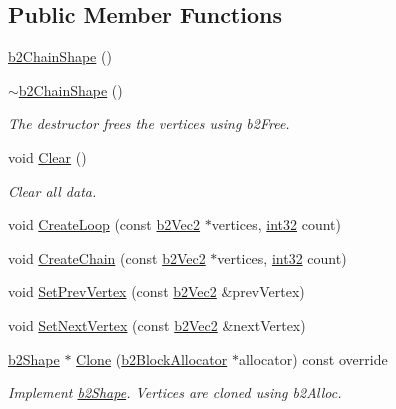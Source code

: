 \subsection*{Public Member Functions}
\begin{DoxyCompactItemize}
\item 
\mbox{\hyperlink{classb2_chain_shape_ac4fafbfed6f5894c9f8173d2a09a1fe7}{b2\+Chain\+Shape}} ()
\item 
\mbox{\hyperlink{classb2_chain_shape_a8c032394f5a85e7fc425a437e7689a18}{$\sim$b2\+Chain\+Shape}} ()
\begin{DoxyCompactList}\small\item\em The destructor frees the vertices using b2\+Free. \end{DoxyCompactList}\item 
void \mbox{\hyperlink{classb2_chain_shape_a434d4b61ab15726302ec5ad484011c33}{Clear}} ()
\begin{DoxyCompactList}\small\item\em Clear all data. \end{DoxyCompactList}\item 
void \mbox{\hyperlink{classb2_chain_shape_ac257742a52cac391e25962a4c703fb06}{Create\+Loop}} (const \mbox{\hyperlink{structb2_vec2}{b2\+Vec2}} $\ast$vertices, \mbox{\hyperlink{b2_settings_8h_a43d43196463bde49cb067f5c20ab8481}{int32}} count)
\item 
void \mbox{\hyperlink{classb2_chain_shape_aa0977339b743c05f2179939ccc38e7e0}{Create\+Chain}} (const \mbox{\hyperlink{structb2_vec2}{b2\+Vec2}} $\ast$vertices, \mbox{\hyperlink{b2_settings_8h_a43d43196463bde49cb067f5c20ab8481}{int32}} count)
\item 
void \mbox{\hyperlink{classb2_chain_shape_aeb2ddbe0c52a98885e91b7c8f597315b}{Set\+Prev\+Vertex}} (const \mbox{\hyperlink{structb2_vec2}{b2\+Vec2}} \&prev\+Vertex)
\item 
void \mbox{\hyperlink{classb2_chain_shape_a15c7c2821a52266ef57621ac7d34a95f}{Set\+Next\+Vertex}} (const \mbox{\hyperlink{structb2_vec2}{b2\+Vec2}} \&next\+Vertex)
\item 
\mbox{\hyperlink{classb2_shape}{b2\+Shape}} $\ast$ \mbox{\hyperlink{classb2_chain_shape_a03d2ea80168d29c553fa21b5a821e6d8}{Clone}} (\mbox{\hyperlink{classb2_block_allocator}{b2\+Block\+Allocator}} $\ast$allocator) const override
\begin{DoxyCompactList}\small\item\em Implement \mbox{\hyperlink{classb2_shape}{b2\+Shape}}. Vertices are cloned using b2\+Alloc. \end{DoxyCompactList}\item 

\end{DoxyCompactItemize}
